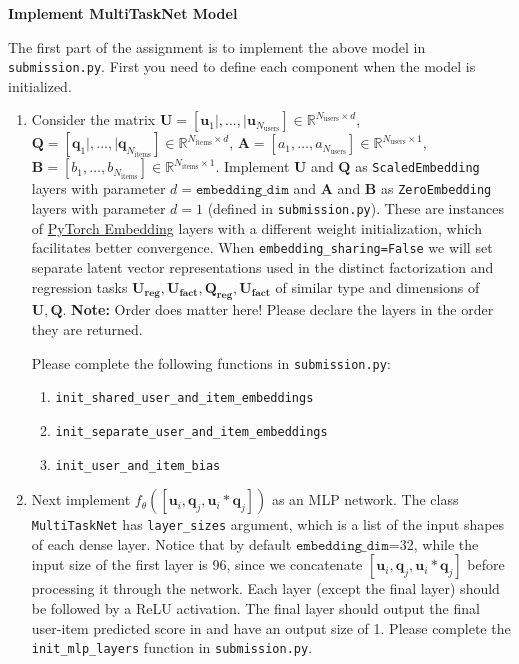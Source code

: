 \item {\bf Implement MultiTaskNet Model}

The first part of the assignment is to implement the above model in \texttt{submission.py}. First you need to define each component when the model is initialized. 

\begin{enumerate}
    \item {} Consider the matrix $\mathbf{U} = [\mathbf{u}_1\mid,\ldots,\mid \mathbf{u}_{N_{\text{users}}}]\in\mathbb{R}^{N_{\text{users}}\times d}$, $\mathbf{Q} = [\mathbf{q}_1\mid,\ldots,\mid\mathbf{q}_{N_{\text{items}}}]\in\mathbb{R}^{N_{\text{items}}\times d}$, $\mathbf{A} = [a_1, \ldots, a_{N_{\text{users}}}]\in \mathbb{R}^{N_{\text{users}}\times 1}$, $\mathbf{B} = [b_1, \ldots, b_{N_{\text{items}}}]\in \mathbb{R}^{N_{\text{items}}\times 1}$. Implement $\mathbf{U}$ and $\mathbf{Q}$ as \texttt{ScaledEmbedding} layers  with parameter $d=\texttt{embedding\_dim}$ and $\mathbf{A}$ and $\mathbf{B}$ as \texttt{ZeroEmbedding} layers with parameter $d=1$ (defined in \texttt{submission.py}). These are instances of \href{https://pytorch.org/docs/stable/generated/torch.nn.Embedding.html}{PyTorch Embedding} layers with a different weight initialization, which facilitates better convergence.
    When \texttt{embedding\_sharing=False} we will set separate latent vector representations used in the distinct factorization and regression tasks $\mathbf{U_{reg}}, \mathbf{U_{fact}}, \mathbf{Q_{reg}}, \mathbf{U_{fact}}$ of similar type and dimensions of $\mathbf{U}, \mathbf{Q}$. \textbf{Note: }Order does matter here! Please declare the layers in the order
    they are returned.
    
    Please complete the following functions in \texttt{submission.py}:
    \begin{enumerate}
        \item \texttt{init\_shared\_user\_and\_item\_embeddings}
        \item \texttt{init\_separate\_user\_and\_item\_embeddings}
        \item \texttt{init\_user\_and\_item\_bias}
    \end{enumerate}

    \item {} Next implement $f_{\theta}([\mathbf{u}_i, \mathbf{q}_j, \mathbf{u}_i * \mathbf{q}_j])$ as an MLP network. The class \texttt{MultiTaskNet} has \texttt{layer\_sizes} argument, which is a list of the input shapes of each dense layer. Notice that by default $\texttt{embedding\_dim}$=32, while the input size of the first layer is 96, since we concatenate $[\mathbf{u}_i, \mathbf{q}_j, \mathbf{u}_i * \mathbf{q}_j]$ before processing it through the network. Each layer (except the final layer) should be followed by a ReLU activation. The final layer should output the final user-item predicted score in and have an output size of 1. Please complete the \texttt{init\_mlp\_layers} function in \texttt{submission.py}.
\end{enumerate}